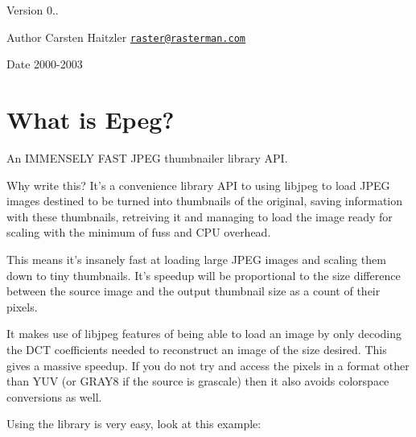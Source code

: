  \begin{DoxyVersion}{Version}
0.. 
\end{DoxyVersion}
\begin{DoxyAuthor}{Author}
Carsten Haitzler \href{mailto:raster@rasterman.com}{\tt raster@rasterman.\-com} 
\end{DoxyAuthor}
\begin{DoxyDate}{Date}
2000-\/2003
\end{DoxyDate}
\hypertarget{index_intro}{}\section{What is Epeg?}\label{index_intro}
An I\-M\-M\-E\-N\-S\-E\-L\-Y F\-A\-S\-T J\-P\-E\-G thumbnailer library A\-P\-I.

Why write this? It's a convenience library A\-P\-I to using libjpeg to load J\-P\-E\-G images destined to be turned into thumbnails of the original, saving information with these thumbnails, retreiving it and managing to load the image ready for scaling with the minimum of fuss and C\-P\-U overhead.

This means it's insanely fast at loading large J\-P\-E\-G images and scaling them down to tiny thumbnails. It's speedup will be proportional to the size difference between the source image and the output thumbnail size as a count of their pixels.

It makes use of libjpeg features of being able to load an image by only decoding the D\-C\-T coefficients needed to reconstruct an image of the size desired. This gives a massive speedup. If you do not try and access the pixels in a format other than Y\-U\-V (or G\-R\-A\-Y8 if the source is grascale) then it also avoids colorspace conversions as well.

Using the library is very easy, look at this example\-:




